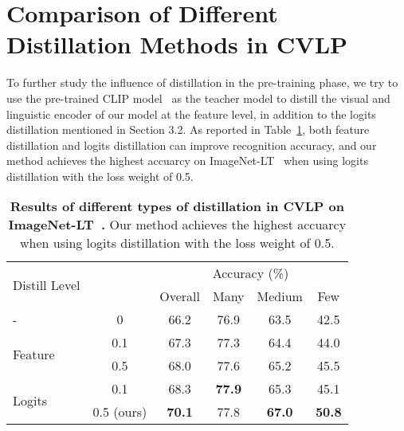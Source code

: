 \documentclass[runningheads]{llncs}
\newlength\savedwidth
\newcommand\whline{\noalign{\global\savedwidth\arrayrulewidth\global\arrayrulewidth 0.8pt}\hline\noalign{\global\arrayrulewidth\savedwidth}}
\begin{document}
\section{Comparison of Different Distillation Methods in CVLP}
To further study the influence of distillation in the pre-training phase, we try to use the pre-trained CLIP model~\cite{clip} as the teacher model to distill the visual and linguistic encoder of our model at the feature level, in addition to the logits distillation mentioned in Section 3.2.
As reported in Table~\ref{tab:distill}, both feature distillation and logits distillation can improve recognition accuracy, and our method achieves the highest accuarcy on ImageNet-LT~\cite{liu2019large} when using logits distillation with the loss weight  of 0.5.
\begin{table}[h]
    \centering
    \setlength{\tabcolsep}{3mm}
    \caption{
    \textbf{Results of different types of distillation in CVLP
    on ImageNet-LT~\cite{liu2019large}.} Our method achieves the highest accuarcy when using logits distillation with the loss weight  of 0.5.
    }
    \begin{tabular}{l|c|c|c|c|c}
\multirow{2}{*}{Distill Level} & \multirow{2}{*}{} & \multicolumn{4}{c}{Accuracy (\%)} \\
\cline{3-6}
&  & Overall  & Many  & Medium  & Few  \\
\whline
- & 0 & 66.2  & 76.9 & 63.5 & 42.5 \\
\hline
\multirow{2}{*}{Feature}    
& 0.1 &    67.3      &   77.3    &   64.4      &  44.0    \\
& 0.5 &     68.0     &    77.6   &    65.2     &   45.5   \\
\hline
\multirow{2}{*}{Logits}        
& 0.1 &    68.3      &   \textbf{77.9}    &    65.3     &  45.1    \\
& \cellcolor{mygray}0.5 (ours)   
& \cellcolor{mygray}\textbf{70.1}
& \cellcolor{mygray}77.8
& \cellcolor{mygray}\textbf{67.0}
& \cellcolor{mygray}\textbf{50.8}\\
\end{tabular} \label{tab:distill}
\end{table}
\end{document}
